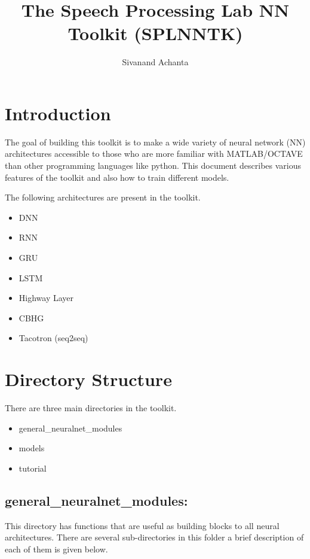 \documentclass[a4paper,11pt]{article}
\title{The Speech Processing Lab NN Toolkit (SPLNNTK)}
\author{Sivanand Achanta}
\begin{document}
\maketitle
\tableofcontents

\newpage

\section{Introduction}
The goal of building this toolkit is to make a wide variety of neural network (NN) architectures accessible to those who are more familiar with MATLAB/OCTAVE than other programming languages like python. This document describes various features of the toolkit and also how to train different models. 

The following architectures are present in the toolkit.
\begin{itemize}
\item DNN
\item RNN
\item GRU
\item LSTM
\item Highway Layer
\item CBHG \cite{cbhg}
\item Tacotron (seq2seq) \cite{tacotron}
\end{itemize}



\section{Directory Structure}
There are three main directories in the toolkit.
\begin{itemize}
\item general\_neuralnet\_modules
\item models
\item tutorial
\end{itemize}

\subsection{general\_neuralnet\_modules:}
This directory has functions that are useful as building blocks to all neural architectures. There are several sub-directories in this folder a brief description of each of them is given below.
\end{document}

